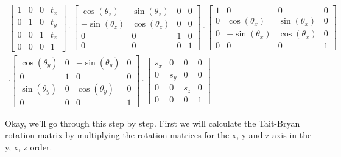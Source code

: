 \documentclass[12pt]{report} \usepackage{preamble}
\begin{document}
\begin{equation}
	\begin{aligned}
		\begin{bmatrix}
			1 & 0 & 0 & t_x \\
			0 & 1 & 0 & t_y \\
			0 & 0 & 1 & t_z \\
			0 & 0 & 0 & 1
		\end{bmatrix}
		\cdot
		\begin{bmatrix}
			\cos(\theta_z)  & \sin(\theta_z) & 0 & 0 \\
			-\sin(\theta_z) & \cos(\theta_z) & 0 & 0 \\
			0               & 0              & 1 & 0 \\
			0               & 0              & 0 & 1
		\end{bmatrix}
		\cdot
		\begin{bmatrix}
			1 & 0               & 0              & 0 \\
			0 & \cos(\theta_x)  & \sin(\theta_x) & 0 \\
			0 & -\sin(\theta_x) & \cos(\theta_x) & 0 \\
			0 & 0               & 0              & 1
		\end{bmatrix}
		\\
		\cdot
		\begin{bmatrix}
			\cos(\theta_y) & 0 & -\sin(\theta_y) & 0 \\
			0              & 1 & 0               & 0 \\
			\sin(\theta_y) & 0 & \cos(\theta_y)  & 0 \\
			0              & 0 & 0               & 1
		\end{bmatrix}
		\cdot
		\begin{bmatrix}
			s_x & 0   & 0   & 0 \\
			0   & s_y & 0   & 0 \\
			0   & 0   & s_z & 0 \\
			0   & 0   & 0   & 1
		\end{bmatrix}
	\end{aligned}
\end{equation}

Okay, we'll go through this step by step. First we will calculate the Tait-Bryan rotation matrix by multiplying the rotation matrices for the x, y and z axis
in the y, x, z order.
\end{document}
